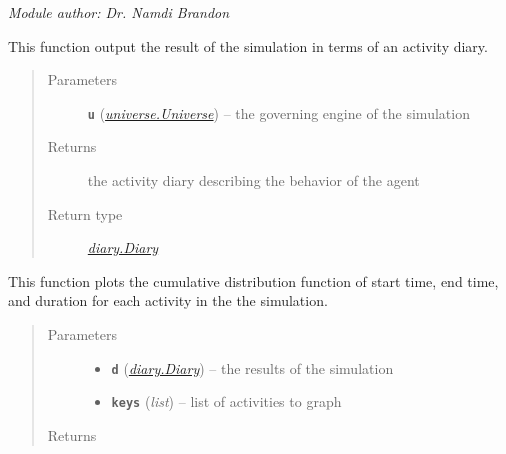 \documentclass[letterpaper,10pt,english]{sphinxmanual}
\begin{document}
\emph{Module author: Dr. Namdi Brandon}

\begin{fulllineitems}
\label{main:main.get_diary}
This function output the result of the simulation in terms of an activity diary.
\begin{quote}\begin{description}
\item[{Parameters}] \leavevmode
\textbf{\texttt{u}} ({\hyperref[universe:universe.Universe]{\emph{\emph{universe.Universe}}}}) -- the governing engine of the simulation

\item[{Returns}] \leavevmode
the activity diary describing the behavior of the agent

\item[{Return type}] \leavevmode
{\hyperref[diary:diary.Diary]{\emph{diary.Diary}}}

\end{description}\end{quote}

\end{fulllineitems}


\begin{fulllineitems}
\label{main:main.plot_cdfs}
This function plots the cumulative distribution function of start time, end time, and duration for     each activity in the the simulation.
\begin{quote}\begin{description}
\item[{Parameters}] \leavevmode\begin{itemize}
\item {} 
\textbf{\texttt{d}} ({\hyperref[diary:diary.Diary]{\emph{\emph{diary.Diary}}}}) -- the results of the simulation

\item {} 
\textbf{\texttt{keys}} (\emph{list}) -- list of activities to graph

\end{itemize}

\item[{Returns}] \leavevmode


\end{description}\end{quote}

\end{fulllineitems}
\end{document}
